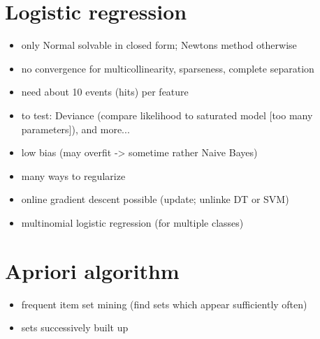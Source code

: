 \documentclass{article}
\begin{document}
\begin{multicols}{3}
\section{Logistic regression}
\begin{itemize}
\item only Normal solvable in closed form; Newtons method otherwise
\item no convergence for multicollinearity, sparseness, complete separation
\item need about 10 events (hits) per feature
\item to test: Deviance (compare likelihood to saturated model [too many parameters]), and more...
\item low bias (may overfit -> sometime rather Naive Bayes)
\item many ways to regularize
\item online gradient descent possible (update; unlinke DT or SVM)
\item multinomial logistic regression (for multiple classes)
\end{itemize}

\section{Apriori algorithm}
\begin{itemize}
\item frequent item set mining (find sets which appear sufficiently often)
\item sets successively built up
\end{itemize}


\end{multicols}
\end{document}

